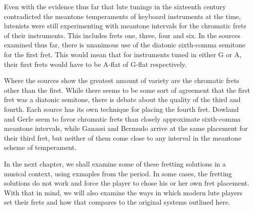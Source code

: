 Even with the evidence thus far that lute tunings in the sixteenth century contradicted the meantone
temperaments of keyboard instruments at the time, lutenists were still
experimenting with meantone intervals for the chromatic frets of their instruments.  This
includes frets one, three, four and six.  In the sources examined thus far, there is unanimous
use of the diatonic sixth-comma semitone for the first fret.  This would mean that for instruments
tuned in either G or A, their first frets would have to be A-flat of G-flat respectively.

Where the sources show the greatest amount of variety are the chromatic frets other than the
first.  While there seems to be some sort of agreement that the first fret was a diatonic
semitone, there is debate about the quality of the third and fourth.  Each source has its own
technique for placing the fourth fret.  Dowland and Gerle seem to favor chromatic frets than
closely approximate sixth-comma meantone intervals, while Ganassi and Bermudo arrive at the same
placement for their third fret, but neither of them come close to any interval in the meantone
scheme of temperament.

In the next chapter, we shall examine some of these fretting solutions in a musical context, using
exmaples from the period.  In some cases, the fretting solutions do not work and force the player
to chose his or her own fret placement.  With that in mind, we will also examine the ways in which
modern lute players set their frets and how that compares to the original systems outlined here.

